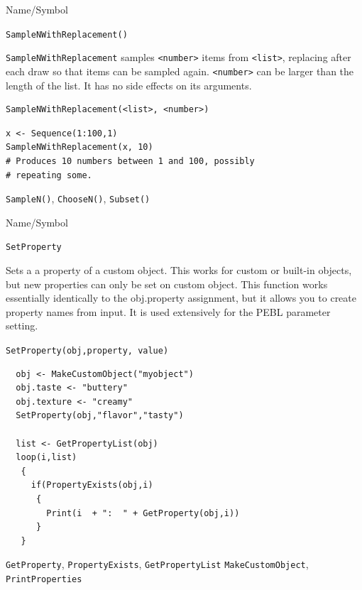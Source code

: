 \begin{desc}{Name/Symbol}
\item[Name/Symbol] 	\verb+SampleNWithReplacement()+

\item[Description] \verb+SampleNWithReplacement+ samples
  \verb+<number>+ items from \verb+<list>+, replacing after each draw
  so that items can be sampled again.  \verb+<number>+ can be larger
  than the length of the list. It has no side effects on its
  arguments.  
\item[Usage]        	
\begin{verbatim}
SampleNWithReplacement(<list>, <number>)
\end{verbatim}

\item[Example] 	
\begin{verbatim}
x <- Sequence(1:100,1)
SampleNWithReplacement(x, 10)
# Produces 10 numbers between 1 and 100, possibly 
# repeating some.
\end{verbatim}

\item[See Also]     	\verb+SampleN()+, \verb+ChooseN()+, \verb+Subset()+
\end{desc}






\begin{desc}{Name/Symbol}
\item[Name/Symbol] \verb+SetProperty+ 

\item[Description]  
Sets a a property of a custom object.   This works for custom or built-in objects, but new properties can only be set on custom object. This function works essentially identically to the obj.property assignment, but it allows you to create property names from input. It is used extensively for the PEBL parameter setting.
  
\item[Usage]       
     \verb+SetProperty(obj,property, value)+ 
\item[Example]

\begin{verbatim}
  obj <- MakeCustomObject("myobject")
  obj.taste <- "buttery"
  obj.texture <- "creamy"
  SetProperty(obj,"flavor","tasty")
  
  list <- GetPropertyList(obj)
  loop(i,list)
   {
     if(PropertyExists(obj,i)
      {
        Print(i  + ":  " + GetProperty(obj,i))
      }
   }
\end{verbatim}


\item[See Also]
\verb+GetProperty+, \verb+PropertyExists+, \verb+GetPropertyList+ \verb+MakeCustomObject+, \verb+PrintProperties+ 
\end{desc} 




